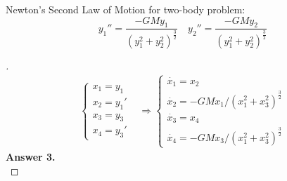 \documentclass[12pt]{article}
\newenvironment{exercise}[2][Exercise]{\begin{trivlist}
\item[\hskip \labelsep {\bfseries #1}\hskip \labelsep {\bfseries #2.}]}{\end{trivlist}}
\begin{document}
\begin{exercise}{3}
	Newton's Second Law of Motion for two-body problem:
	\[ 	y_1'' = \frac{- G M y_1}{(y_1^2 + y_2^2)^\frac{3}{2}} \quad
		y_2'' = \frac{- G M y_2}{(y_1^2 + y_2^2)^\frac{3}{2}} \] 
\end{exercise} \vspace{-10mm}
\begin{proof}[]
	\begin{align*}
	\begin{cases} x_1 = y_1 \\ x_2 = y_1' \\ x_3 = y_3 \\ x_4 = y_3' \end{cases}
	& \Rightarrow \begin{cases}
	\dot{x_1} = x_2 \\
	\dot{x_2} = - G M x_1 / (x_1^2 + x_3^2)^\frac{3}{2} \\
	\dot{x_3} = x_4 \\
	\dot{x_4} = - G M x_3 / (x_1^2 + x_3^2)^\frac{3}{2}
	\end{cases}
	\end{align*}
	\textbf{Answer 3.} \vspace{-7mm} \\
	\[ \boxed{  } \]
\end{proof}
\end{document}
